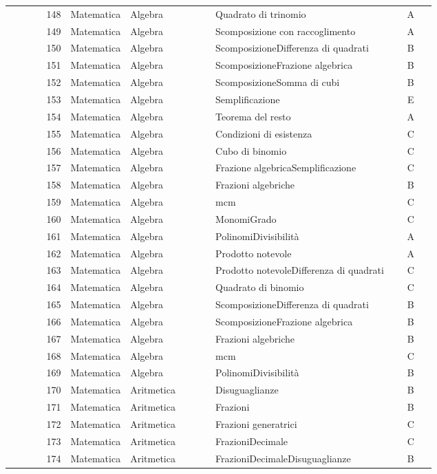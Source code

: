\documentclass[20pt, a4paper]{article}
\begin{document}
\begin{longtable}{@{}r>{\raggedright\arraybackslash}p{0.14\linewidth}>{\raggedright\arraybackslash}p{0.20\linewidth}>{\raggedright\arraybackslash}p{0.42\linewidth}c@{}}
148 & Matematica & Algebra & Quadrato di trinomio & A \\
149 & Matematica & Algebra & Scomposizione con raccoglimento & A \\
150 & Matematica & Algebra & ScomposizioneDifferenza di quadrati & B \\
151 & Matematica & Algebra & ScomposizioneFrazione algebrica & B \\
152 & Matematica & Algebra & ScomposizioneSomma di cubi & B \\
153 & Matematica & Algebra & Semplificazione & E \\
154 & Matematica & Algebra & Teorema del resto & A \\
155 & Matematica & Algebra & Condizioni di esistenza & C \\
156 & Matematica & Algebra & Cubo di binomio & C \\
157 & Matematica & Algebra & Frazione algebricaSemplificazione & C \\
158 & Matematica & Algebra & Frazioni algebriche & B \\
159 & Matematica & Algebra & mcm & C \\
160 & Matematica & Algebra & MonomiGrado & C \\
161 & Matematica & Algebra & PolinomiDivisibilità & A \\
162 & Matematica & Algebra & Prodotto notevole & A \\
163 & Matematica & Algebra & Prodotto notevoleDifferenza di quadrati & C \\
164 & Matematica & Algebra & Quadrato di binomio & C \\
165 & Matematica & Algebra & ScomposizioneDifferenza di quadrati & B \\
166 & Matematica & Algebra & ScomposizioneFrazione algebrica & B \\
167 & Matematica & Algebra & Frazioni algebriche & B \\
168 & Matematica & Algebra & mcm & C \\
169 & Matematica & Algebra & PolinomiDivisibilità & B \\
170 & Matematica & Aritmetica & Disuguaglianze & B \\
171 & Matematica & Aritmetica & Frazioni & B \\
172 & Matematica & Aritmetica & Frazioni generatrici & C \\
173 & Matematica & Aritmetica & FrazioniDecimale & C \\
174 & Matematica & Aritmetica & FrazioniDecimaleDisuguaglianze & B \\

\end{longtable}
\end{document}
